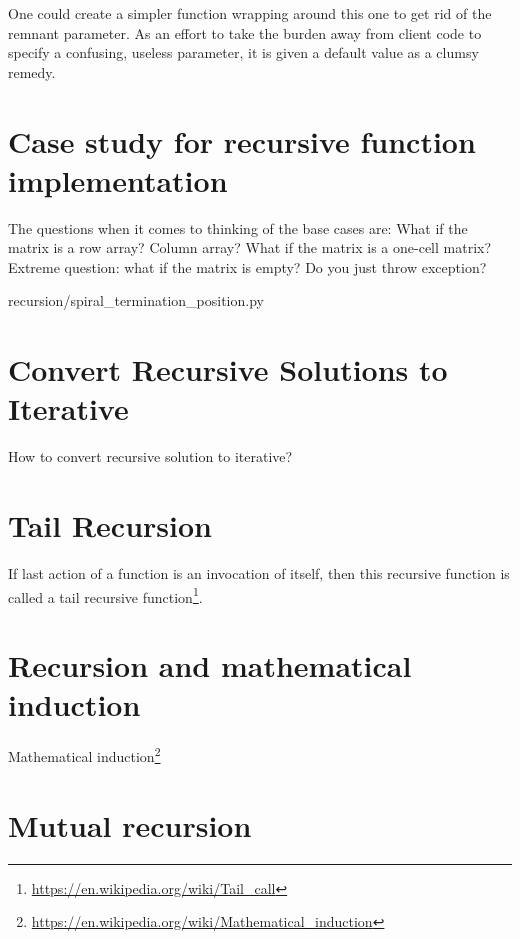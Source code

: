 \documentclass[oneside,11pt]{book}
\theoremstyle{definition}
\theoremstyle{remark}
\begin{document}
One could create a simpler function wrapping around this one to get rid of the remnant
parameter.
As an effort to take the burden away from client code to specify a confusing, useless parameter,
it is given a default value as a clumsy remedy.

\section{Case study for recursive function implementation}\label{sec:recursivecaseStudy}

The questions when it comes to thinking of the base cases are:
What if the matrix is a row array?
Column array?
What if the matrix is a one-cell matrix?
Extreme question: what if the matrix is empty?
Do you just throw exception?

\begin{clisting}
    
    {recursion/spiral_termination_position.py}
\end{clisting}

\section{Convert Recursive Solutions to Iterative}\label{sec:recursiveToIterative}

How to convert recursive solution to iterative?

\section{Tail Recursion}\label{sec:tailRecursion}

If last action of a function is an invocation of itself, then this recursive function is called a
tail recursive function\footnote{\url{https://en.wikipedia.org/wiki/Tail_call}}.

\section{Recursion and mathematical induction}\label{sec:recursionMathematicalInduction}

Mathematical induction\footnote{\url{https://en.wikipedia.org/wiki/Mathematical_induction}}

\section{Mutual recursion}\label{sec:mutual-recursion}
\end{document}
